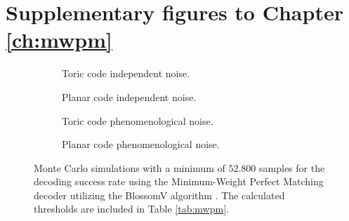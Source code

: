 \chapter{Supplementary figures to Chapter \ref{ch:mwpm}}\label{ap:figmwpm}

\begin{figure}[htbp]
    \centering
    \begin{subfigure}[b]{0.49\textwidth}
      \begin{adjustbox}{Clip=0 1em 0 0}
        
      \end{adjustbox}
      \caption{Toric code independent noise.}
    \end{subfigure}
    \begin{subfigure}[b]{0.49\textwidth}
      \begin{adjustbox}{Clip=0 1em 0 0}
        
      \end{adjustbox}
      \caption{Planar code independent noise.}
    \end{subfigure}
    \begin{subfigure}[b]{0.49\textwidth}
      \begin{adjustbox}{Clip=0 1em 0 0}
        
      \end{adjustbox}
      \caption{Toric code phenomenological noise.}
    \end{subfigure}
    \begin{subfigure}[b]{0.49\textwidth}
      \begin{adjustbox}{Clip=0 1em 0 0}
        
      \end{adjustbox}
      \caption{Planar code phenomenological noise.}
    \end{subfigure}
    \caption{Monte Carlo simulations with a minimum of $52.800$ samples for the decoding success rate using the Minimum-Weight Perfect Matching decoder utilizing the BlossomV algorithm \cite{kolmogorov2009blossom}. The calculated thresholds are included in Table \ref{tab:mwpm}.}
    \label{fig:threshold_mwpm}
  \end{figure}
